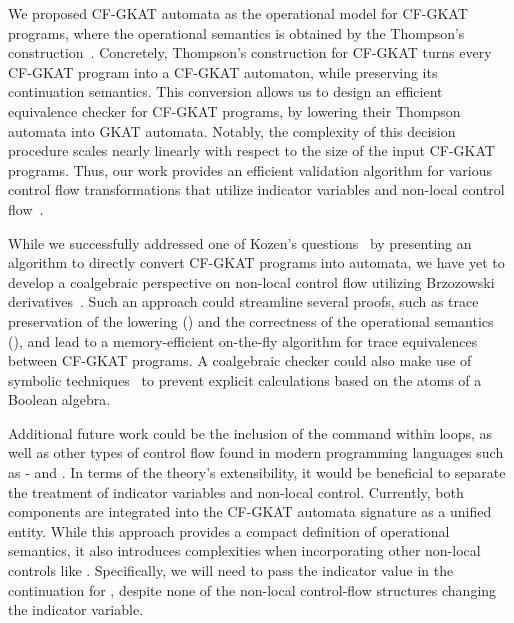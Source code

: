 We proposed CF-GKAT automata as the operational model for CF-GKAT programs, where the operational semantics is obtained by the Thompson's construction~\cite{thompson_ProgrammingTechniquesRegular_1968,Smolka_Foster_Hsu_Kappé_Kozen_Silva_2020}.
Concretely, Thompson's construction for CF-GKAT turns every CF-GKAT program into a CF-GKAT automaton, while preserving its continuation semantics.
This conversion allows us to design an efficient equivalence checker for CF-GKAT programs, by lowering their Thompson automata into GKAT automata.
Notably, the complexity of this decision procedure scales nearly linearly with respect to the size of the input CF-GKAT programs. 
Thus, our work provides an efficient validation algorithm for various control flow transformations that utilize indicator variables and non-local control flow~\cite{yakdan_NoMoreGotos_2015,erosa-hendren-1994}.

While we successfully addressed one of Kozen's questions~\cite{kozen_NonlocalFlowControl_2008} by presenting an algorithm to directly convert CF-GKAT programs into automata, we have yet to develop a coalgebraic perspective on non-local control flow utilizing Brzozowski derivatives~\cite{brzozowski_DerivativesRegularExpressions_1964}.
Such an approach could streamline several proofs, such as trace preservation of the lowering () and the correctness of the operational semantics (), and lead to a memory-efficient on-the-fly algorithm for trace equivalences between CF-GKAT programs.
A coalgebraic checker could also make use of symbolic techniques~\cite{pous_SymbolicAlgorithmsLanguage_2015} to prevent explicit calculations based on the atoms of a Boolean algebra.

Additional future work could be the inclusion of the  command within loops, as well as other types of control flow found in modern programming languages such as - and .
In terms of the theory's extensibility, it would be beneficial to separate the treatment of indicator variables and non-local control. 
Currently, both components are integrated into the CF-GKAT automata signature as a unified entity. 
While this approach provides a compact definition of operational semantics, it also introduces complexities when incorporating other non-local controls like .  
Specifically, we will need to pass the indicator value in the continuation for , despite none of the non-local control-flow structures changing the indicator variable.

